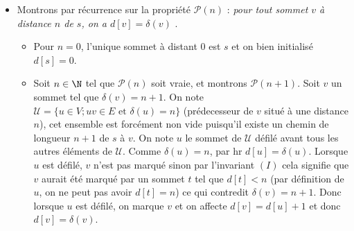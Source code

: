\documentclass[11pt,a4paper]{article}
\begin{document}
\begin{itemize}
\item[\textbullet]Montrons par récurrence sur la propriété $\mathcal{P}(n)$ : \og{}\textit{pour tout sommet $v$ à distance $n$ de $s$, on a $d[v]=\delta(v)$} \fg{}.
\begin{itemize}
    \item Pour $n=0$, l'unique sommet à distant $0$ est $s$ et on bien initialisé $d[s]=0$.
    \item Soit $n \in \N$ tel que $\mathcal{P}(n)$ soit vraie, et montrons $\mathcal{P}(n+1)$. Soit $v$ un sommet tel que $\delta(v) = n+1$. On note $\mathcal{U} = \{ u \in V; uv \in E \text{ et } \delta(u)=n \}$ (prédecesseur de $v$ situé à une distance $n$), cet ensemble est forcément non vide puisqu'il existe un chemin de longueur $n+1$ de $s$ à $v$. On note $u$ le sommet de $\mathcal{U}$ défilé avant tous les autres éléments de $\mathcal{U}$. Comme $\delta(u)=n$, par {\sc hr} $d[u] = \delta(u)$. Lorsque $u$ est défilé, $v$ n'est pas marqué sinon par l'invariant $(I)$ cela signifie que $v$ aurait été marqué par un sommet $t$ tel que $d[t] < n$ (par définition de $u$, on ne peut pas avoir $d[t]=n$) ce qui contredit $\delta(v) = n+1$. Donc lorsque $u$ est défilé, on marque $v$ et on affecte $d[v] = d[u] + 1$ et donc $d[v] = \delta(v)$.
\end{itemize}

\end{itemize}
\end{document}
